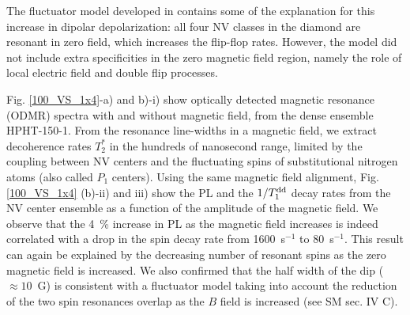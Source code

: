 \documentclass[preprintnumbers,amsmath,amssymb,superscriptaddress,twocolumn,showpacs]{revtex4-2}
\begin{document}
The fluctuator model developed in \citep{choi2017depolarization} contains some of the explanation for this increase in dipolar depolarization: all four NV classes in the diamond are resonant in zero field, which increases the flip-flop rates. However, the model did not include extra specificities in the zero magnetic field region, namely the role of local electric field and double flip processes. 


Fig. \ref{100_VS_1x4}-a) and b)-i) show optically detected magnetic resonance (ODMR) spectra with and without magnetic field, from the dense ensemble HPHT-150-1. From the resonance line-widths in a magnetic field, we extract decoherence rates $T_2^*$ in the hundreds of nanosecond range, limited by the coupling between NV centers and the fluctuating spins of substitutional nitrogen atoms (also called $P_1$ centers).
Using the same magnetic field alignment, Fig. \ref{100_VS_1x4} (b)-ii) and iii) show the PL and the $1/ T_1^{\rm dd}$ decay rates from the NV center ensemble as a function of the amplitude of the magnetic field. 
We observe that the 4~\% increase in PL as the magnetic field increases is indeed correlated with a drop in the spin decay rate from 1600~s$^{-1}$ to 80~s$^{-1}$. This result can again be explained by the decreasing number of resonant spins as the zero magnetic field is increased. We also confirmed that the half width of the dip ($\approx 10$~G) is consistent with a fluctuator model taking into account the reduction of the two spin resonances overlap as the $B$ field is increased (see SM sec. IV C).
\end{document}
